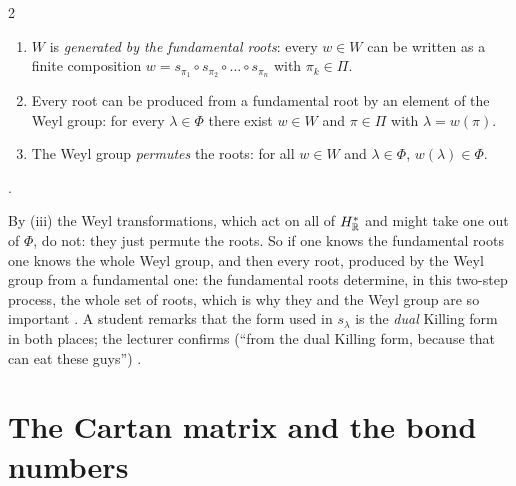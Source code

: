 \begin{paracol}{2}
\begin{theorem}\label{thm:cl-weyl}
\begin{enumerate}
  \item[(i)] $W$ is \emph{generated by the fundamental roots}: every $w\in W$ can be written as a finite composition $w=s_{\pi_1}\circ s_{\pi_2}\circ\dots\circ s_{\pi_n}$ with $\pi_k\in\Pi$.
  \item[(ii)] Every root can be produced from a fundamental root by an element of the Weyl group: for every $\lambda\in\Phi$ there exist $w\in W$ and $\pi\in\Pi$ with $\lambda=w(\pi)$.
  \item[(iii)] The Weyl group \emph{permutes} the roots: for all $w\in W$ and $\lambda\in\Phi$, $w(\lambda)\in\Phi$.
\end{enumerate}
            .
\end{theorem}
By (iii) the Weyl transformations, which act on all of $H^*_{\mathbb{R}}$ and might take one out of $\Phi$, do not: they just permute the roots. So if one knows the fundamental roots one knows the whole Weyl group, and then every root, produced by the Weyl group from a fundamental one: the fundamental roots determine, in this two-step process, the whole set of roots, which is why they and the Weyl group are so important   .
A student remarks that the form used in $s_\lambda$ is the \emph{dual} Killing form in both places; the lecturer confirms (``from the dual Killing form, because that can eat these guys'')  .

\section{The Cartan matrix and the bond numbers}\label{sec:cl-cartan-matrix}


\end{paracol}
